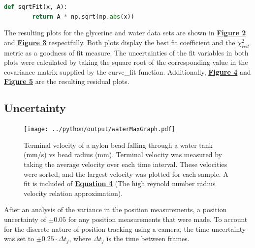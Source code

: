 \documentclass[
	letterpaper
	12pt
]{template}
\newcommand{\bref}[2]{\textbf{\hyperref[#1]{#2}}}
\begin{document}
\begin{lstlisting}[label={fnc::sqrtFit}, captionpos=b,language=python]
	def sqrtFit(x, A):
		return A * np.sqrt(np.abs(x))
\end{lstlisting}

The resulting plots for the glycerine and water data sets are shown in \bref{fig::terminalPlotG}{Figure 2} and \bref{fig::terminalPlotW}{Figure 3} respectfully. Both plots display the best fit coefficient and the $\chi_{red}^2$ metric as a goodness of fit measure. The uncertainties of the fit variables in both plots were calculated by taking the square root of the corresponding value in the covariance matrix supplied by the curve\_fit function. Additionally, \bref{fig::terminalPlotGRes}{Figure 4} and \bref{fig::terminalPlotWRes}{Figure 5} are the resulting residual plots.

\subsection{Uncertainty}\label{sec::uncertainty}

\begin{figure}\label{fig::terminalPlotW}
	\vspace{-32pt}
	\centering
	\texttt{[image: ../python/output/waterMaxGraph.pdf]}
	\caption{Terminal velocity of a nylon bead falling through a water tank (mm/s) vs bead radius (mm). Terminal velocity was measured by taking the average velocity over each time interval. These velocities were sorted, and the largest velocity was plotted for each sample. A fit is included of \bref{eqn::terminalVelocity}{Equation 4} (The high reynold number radius velocity relation approximation).}
	\vspace{-20pt}
\end{figure}

After an analysis of the variance in the position measurements, a position uncertainty of $\pm 0.05$ for any position measurements that were made. To account for the discrete nature of position tracking using a camera, the time uncertainty was set to $\pm 0.25 \cdot \Delta t_f$, where $\Delta t_f$ is the time between frames.\vspace{\baselineskip}
\end{document}
